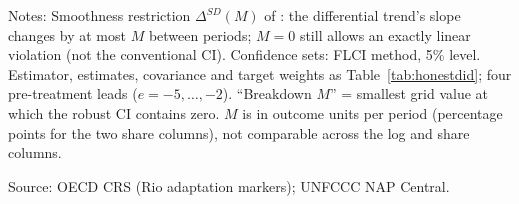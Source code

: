 \begin{table}[H]
\centering
\caption{HonestDiD robust 95\% CI under the smoothness restriction $\Delta^{SD}(M)$}
\label{tab:honestdid_sd}
\begingroup\small
{}
\endgroup
\par\vspace{4pt}
\begin{minipage}{\linewidth}\footnotesize
Notes: Smoothness restriction $\Delta^{SD}(M)$ of \citet{rambachan_roth_2023}: the differential trend's slope changes by at most $M$ between periods; $M = 0$ still allows an exactly linear violation (not the conventional CI). Confidence sets: FLCI method, 5\% level. Estimator, estimates, covariance and target weights as Table~\ref{tab:honestdid}; four pre-treatment leads ($e = -5,\dots,-2$). ``Breakdown $M$'' = smallest grid value at which the robust CI contains zero. $M$ is in outcome units per period (percentage points for the two share columns), not comparable across the log and share columns.\par
Source: OECD CRS (Rio adaptation markers); UNFCCC NAP Central.
\end{minipage}
\end{table}
